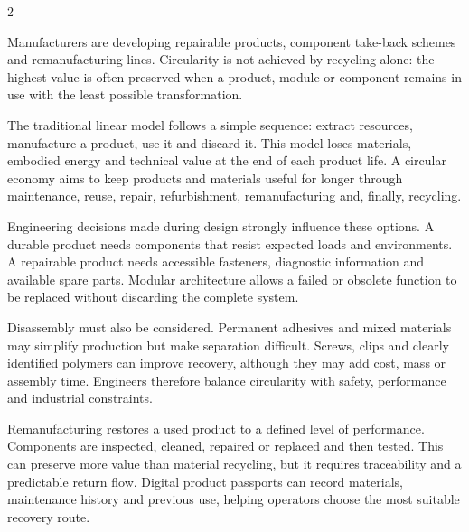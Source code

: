 

\begin{multicols}{2}
\begin{engineeringnews}
Manufacturers are developing repairable products, component take-back schemes and remanufacturing
lines. Circularity is not achieved by recycling alone: the highest value is often preserved when a
product, module or component remains in use with the least possible transformation.
\end{engineeringnews}

\begin{ecarticle}
The traditional linear model follows a simple sequence: extract resources, manufacture a product,
use it and discard it. This model loses materials, embodied energy and technical value at the end of
each product life. A circular economy aims to keep products and materials useful for longer through
maintenance, reuse, repair, refurbishment, remanufacturing and, finally, recycling.

Engineering decisions made during design strongly influence these options. A durable product needs
components that resist expected loads and environments. A repairable product needs accessible
fasteners, diagnostic information and available spare parts. Modular architecture allows a failed or
obsolete function to be replaced without discarding the complete system.

Disassembly must also be considered. Permanent adhesives and mixed materials may simplify production
but make separation difficult. Screws, clips and clearly identified polymers can improve recovery,
although they may add cost, mass or assembly time. Engineers therefore balance circularity with safety,
performance and industrial constraints.

Remanufacturing restores a used product to a defined level of performance. Components are inspected,
cleaned, repaired or replaced and then tested. This can preserve more value than material recycling,
but it requires traceability and a predictable return flow. Digital product passports can record
materials, maintenance history and previous use, helping operators choose the most suitable recovery
route.


\end{ecarticle}
\end{multicols}
